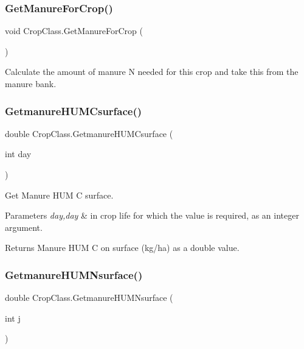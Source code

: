 \subsubsection{\texorpdfstring{GetManureForCrop()}{GetManureForCrop()}}
{\footnotesize\ttfamily void Crop\+Class.\+Get\+Manure\+For\+Crop (\begin{DoxyParamCaption}{ }\end{DoxyParamCaption})\hspace{0.3cm}{\ttfamily [inline]}}



Calculate the amount of manure N needed for this crop and take this from the manure bank. 

\mbox{\label{class_crop_class_ac2d29d7d8d81c021821ae92b038787b1}} 
\subsubsection{\texorpdfstring{GetmanureHUMCsurface()}{GetmanureHUMCsurface()}}
{\footnotesize\ttfamily double Crop\+Class.\+Getmanure\+H\+U\+M\+Csurface (\begin{DoxyParamCaption}\item[{int}]{day }\end{DoxyParamCaption})\hspace{0.3cm}{\ttfamily [inline]}}



Get Manure H\+UM C surface. 


\begin{DoxyParams}{Parameters}
{\em day,day} & in crop life for which the value is required, as an integer argument. \\
\hline
\end{DoxyParams}
\begin{DoxyReturn}{Returns}
Manure H\+UM C on surface (kg/ha) as a double value. 
\end{DoxyReturn}
\mbox{\label{class_crop_class_a5fe271fc582346c1baf45adfa643db78}} 
\subsubsection{\texorpdfstring{GetmanureHUMNsurface()}{GetmanureHUMNsurface()}}
{\footnotesize\ttfamily double Crop\+Class.\+Getmanure\+H\+U\+M\+Nsurface (\begin{DoxyParamCaption}\item[{int}]{j }\end{DoxyParamCaption})\hspace{0.3cm}{\ttfamily [inline]}}



